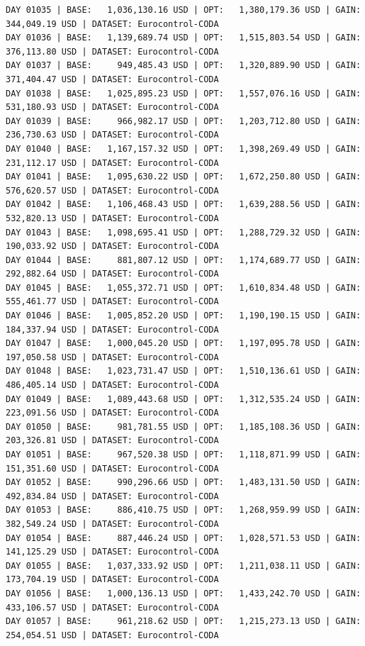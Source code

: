 \documentclass[11pt,a4paper]{article}
\begin{document}
\begin{verbatim}
DAY 01035 | BASE:   1,036,130.16 USD | OPT:   1,380,179.36 USD | GAIN: 344,049.19 USD | DATASET: Eurocontrol-CODA
DAY 01036 | BASE:   1,139,689.74 USD | OPT:   1,515,803.54 USD | GAIN: 376,113.80 USD | DATASET: Eurocontrol-CODA
DAY 01037 | BASE:     949,485.43 USD | OPT:   1,320,889.90 USD | GAIN: 371,404.47 USD | DATASET: Eurocontrol-CODA
DAY 01038 | BASE:   1,025,895.23 USD | OPT:   1,557,076.16 USD | GAIN: 531,180.93 USD | DATASET: Eurocontrol-CODA
DAY 01039 | BASE:     966,982.17 USD | OPT:   1,203,712.80 USD | GAIN: 236,730.63 USD | DATASET: Eurocontrol-CODA
DAY 01040 | BASE:   1,167,157.32 USD | OPT:   1,398,269.49 USD | GAIN: 231,112.17 USD | DATASET: Eurocontrol-CODA
DAY 01041 | BASE:   1,095,630.22 USD | OPT:   1,672,250.80 USD | GAIN: 576,620.57 USD | DATASET: Eurocontrol-CODA
DAY 01042 | BASE:   1,106,468.43 USD | OPT:   1,639,288.56 USD | GAIN: 532,820.13 USD | DATASET: Eurocontrol-CODA
DAY 01043 | BASE:   1,098,695.41 USD | OPT:   1,288,729.32 USD | GAIN: 190,033.92 USD | DATASET: Eurocontrol-CODA
DAY 01044 | BASE:     881,807.12 USD | OPT:   1,174,689.77 USD | GAIN: 292,882.64 USD | DATASET: Eurocontrol-CODA
DAY 01045 | BASE:   1,055,372.71 USD | OPT:   1,610,834.48 USD | GAIN: 555,461.77 USD | DATASET: Eurocontrol-CODA
DAY 01046 | BASE:   1,005,852.20 USD | OPT:   1,190,190.15 USD | GAIN: 184,337.94 USD | DATASET: Eurocontrol-CODA
DAY 01047 | BASE:   1,000,045.20 USD | OPT:   1,197,095.78 USD | GAIN: 197,050.58 USD | DATASET: Eurocontrol-CODA
DAY 01048 | BASE:   1,023,731.47 USD | OPT:   1,510,136.61 USD | GAIN: 486,405.14 USD | DATASET: Eurocontrol-CODA
DAY 01049 | BASE:   1,089,443.68 USD | OPT:   1,312,535.24 USD | GAIN: 223,091.56 USD | DATASET: Eurocontrol-CODA
DAY 01050 | BASE:     981,781.55 USD | OPT:   1,185,108.36 USD | GAIN: 203,326.81 USD | DATASET: Eurocontrol-CODA
DAY 01051 | BASE:     967,520.38 USD | OPT:   1,118,871.99 USD | GAIN: 151,351.60 USD | DATASET: Eurocontrol-CODA
DAY 01052 | BASE:     990,296.66 USD | OPT:   1,483,131.50 USD | GAIN: 492,834.84 USD | DATASET: Eurocontrol-CODA
DAY 01053 | BASE:     886,410.75 USD | OPT:   1,268,959.99 USD | GAIN: 382,549.24 USD | DATASET: Eurocontrol-CODA
DAY 01054 | BASE:     887,446.24 USD | OPT:   1,028,571.53 USD | GAIN: 141,125.29 USD | DATASET: Eurocontrol-CODA
DAY 01055 | BASE:   1,037,333.92 USD | OPT:   1,211,038.11 USD | GAIN: 173,704.19 USD | DATASET: Eurocontrol-CODA
DAY 01056 | BASE:   1,000,136.13 USD | OPT:   1,433,242.70 USD | GAIN: 433,106.57 USD | DATASET: Eurocontrol-CODA
DAY 01057 | BASE:     961,218.62 USD | OPT:   1,215,273.13 USD | GAIN: 254,054.51 USD | DATASET: Eurocontrol-CODA

\end{verbatim}
\end{document}
